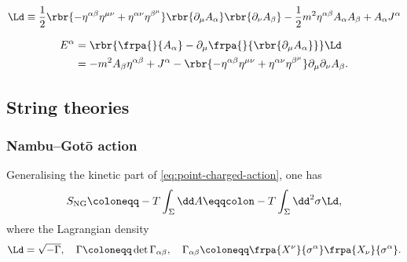 \documentclass[a4paper,11pt]{article}
\begin{document}
\begin{equation}
\Ld \equiv \frac{1}{2}\rbr{-\eta^{\alpha\beta}\eta^{\mu\nu} + \eta^{\alpha\nu} 
\eta^{\beta^\mu}}\rbr{\partial_\mu A_\alpha}\rbr{\partial_\nu A_\beta}
- \frac{1}{2} m^2 \eta^{\alpha\beta} A_\alpha A_\beta + A_\alpha J^\alpha
\end{equation}


\begin{align}
E^\alpha &= \rbr{\frpa{}{A_\alpha} - \partial_\mu \frpa{}{\rbr{\partial_\mu 
A_\alpha}}}\Ld \nonumber \\
&= -m^2 A_\beta \eta^{\alpha\beta} + J^\alpha -\rbr{-\eta^{\alpha\beta} 
\eta^{\mu\nu} + \eta^{\alpha\nu} \eta^{\beta^\mu}}
\partial_\mu \partial_\nu A_\beta.
\end{align}








\subsection{String theories}

\subsubsection*{Nambu--Gotō action}

Generalising the kinetic part of \eqref{eq:point-charged-action}, one has
\begin{equation}
S_\text{NG} \coloneqq -T \int_\Sigma \dd A
\eqqcolon -T \int_\Sigma\dd^2\sigma \Ld,
\end{equation}
where the Lagrangian density
\begin{equation}
\Ld = \sqrt{-\Gamma},\quad
\Gamma \coloneqq \det \Gamma_{\alpha\beta},\quad
\Gamma_{\alpha\beta} \coloneqq \frpa{X^\nu}{\sigma^\alpha} 
\frpa{X_\nu}{\sigma^\alpha}.
\end{equation}
\end{document}

